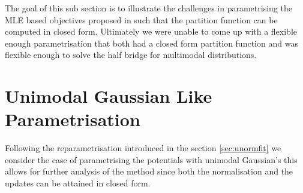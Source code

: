 \documentclass[a4paper,12pt,twoside,openright]{report}
\theoremstyle{definition}
\begin{document}
The goal of this sub section is to illustrate the challenges in parametrising the MLE based objectives proposed in \cite{pavon2018data} such that the partition function can be computed in closed form. Ultimately we were unable to come up with a flexible enough parametrisation that both had a closed form partition function and was flexible enough to solve the half bridge for multimodal distributions.

\section{Unimodal Gaussian Like Parametrisation}

Following the reparametrisation introduced in the section \ref{sec:unormfit} we consider the case of parametrising the potentials with unimodal Gaussian's this allows for further analysis of the method since both the normalisation and the updates can be attained in closed form. 
\end{document}
